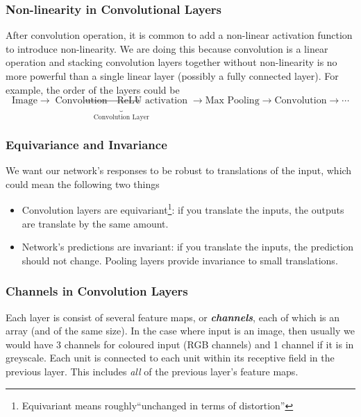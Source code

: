 \documentclass[11pt]{article}
\begin{document}
\subsubsection{Non-linearity in Convolutional Layers}
After convolution operation, it is common to add a non-linear activation function to introduce non-linearity. We are doing this because convolution is a linear operation and stacking convolution layers together without non-linearity is no more powerful than a single linear layer (possibly a fully connected layer). For example, the order of the layers could be
\begin{equation}
    \text{Image} \rightarrow \underbrace{\text{Convolution} \rightarrow \text{ReLU activation}}_{\text{Convolution Layer}} \rightarrow \text{Max Pooling} \rightarrow \text{Convolution} \rightarrow \cdots
\end{equation}

\subsubsection{Equivariance and Invariance}
We want our network's responses to be robust to translations of the input, which could mean the following two things
\begin{itemize}
    \item Convolution layers are equivariant\footnote{Equivariant means roughly``unchanged in terms of distortion''}: if you translate the inputs, the outputs are translate by the same amount. 
    \item Network's predictions are invariant: if you translate the inputs, the prediction should not change. Pooling layers provide invariance to small translations. 
\end{itemize}

\subsubsection{Channels in Convolution Layers}
Each layer is consist of several feature maps, or \textit{\textbf{channels}}, each of which is an array (and of the same size). In the case where input is an image, then usually we would have 3 channels for coloured input (RGB channels) and 1 channel if it is in greyscale. Each unit is connected to each unit within its receptive field in the previous layer. This includes \textit{all} of the previous layer's feature maps. 
\end{document}
